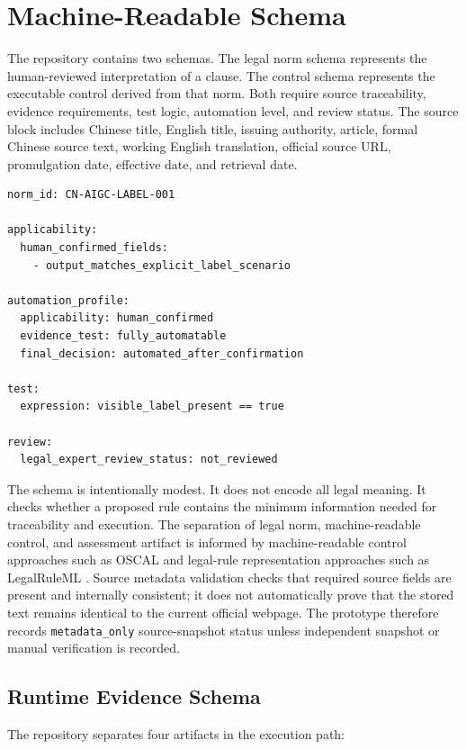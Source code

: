 \documentclass[10pt,journal]{IEEEtran}
\begin{document}
\section{Machine-Readable Schema}

The repository contains two schemas. The legal norm schema represents the human-reviewed interpretation of a clause. The control schema represents the executable control derived from that norm. Both require source traceability, evidence requirements, test logic, automation level, and review status. The source block includes Chinese title, English title, issuing authority, article, formal Chinese source text, working English translation, official source URL, promulgation date, effective date, and retrieval date.

\begin{lstlisting}
norm_id: CN-AIGC-LABEL-001

applicability:
  human_confirmed_fields:
    - output_matches_explicit_label_scenario

automation_profile:
  applicability: human_confirmed
  evidence_test: fully_automatable
  final_decision: automated_after_confirmation

test:
  expression: visible_label_present == true

review:
  legal_expert_review_status: not_reviewed
\end{lstlisting}

The schema is intentionally modest. It does not encode all legal meaning. It checks whether a proposed rule contains the minimum information needed for traceability and execution. The separation of legal norm, machine-readable control, and assessment artifact is informed by machine-readable control approaches such as OSCAL \cite{nistOscal} and legal-rule representation approaches such as LegalRuleML \cite{legalRuleMl2021}. Source metadata validation checks that required source fields are present and internally consistent; it does not automatically prove that the stored text remains identical to the current official webpage. The prototype therefore records \texttt{metadata\_only} source-snapshot status unless independent snapshot or manual verification is recorded.

\subsection{Runtime Evidence Schema}

The repository separates four artifacts in the execution path:
\end{document}
